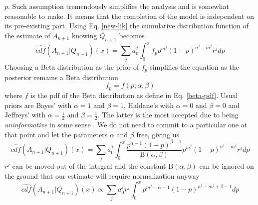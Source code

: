 \documentclass[runningheads]{llncs}
\begin{document}
$p$. Such assumption tremendously simplifies the analysis and is
somewhat reasonable to make. It means that the completion of the model
is independent on its pre-existing part.
Using Eq. \ref{new-lik} the cumulative distribution function of the
estimate of $A_{n+1}$ knowing $Q_{n+1}$ becomes
\begin{equation}
  \label{betaconsol}
  \hat{cdf}(A_{n+1}|Q_{n+1})(x) = \sum_j a_0^j \int_0^x f_p p^{m^j}(1-p)^{n^j-m^j}
  r^j dp
\end{equation}
Choosing a Beta distribution as the prior of $f_p$ simplifies the
equation as the posterior remains a Beta distribution
\begin{equation}
f_p = f(p; \alpha, \beta)
\end{equation}
where $f$ is the pdf of the Beta distribution as define in
Eq. \ref{beta-pdf}. Usual priors are Bayes' with $\alpha = 1$ and
$\beta = 1$, Haldane's with $\alpha = 0$ and $\beta = 0$ and Jeffreys'
with $\alpha = \frac{1}{2}$ and $\beta = \frac{1}{2}$. The latter is
the most accepted due to being \emph{uninformative} in some sense
\cite{Jeffreys46Invariant}. We do not need to commit to a particular
one at that point and let the parameters $\alpha$ and $\beta$ free,
giving us
\begin{equation}
  \label{betaconsol-1}
  \hat{cdf}(A_{n+1}|Q_{n+1})(x) = \sum_j a_0^j \int_0^x
  \frac{p^{\alpha - 1}(1-p)^{\beta - 1}}{\mathrm{B}(\alpha, \beta)}
  p^{m^j}(1-p)^{n^j-m^j} r^j dp
\end{equation}
$r^j$ can be moved out of the integral and the constant
$\mathrm{B}(\alpha, \beta)$ can be ignored on the ground that our
estimate will require normalization anyway
\begin{equation}
  \label{betaconsol-2}
  \hat{cdf}(A_{n+1}|Q_{n+1})(x) \propto \sum_j a_0^j r^j
  \int_0^x p^{m^j+\alpha - 1}(1-p)^{n^j-m^j+\beta - 1} dp
\end{equation}
\end{document}
